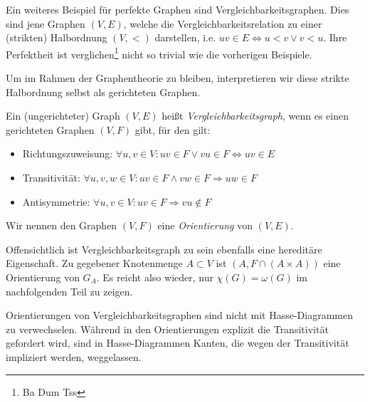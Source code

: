 \documentclass[../main.tex]{subfiles}
\begin{document}
Ein weiteres Beispiel für perfekte Graphen sind Vergleichbarkeitsgraphen. Dies sind jene Graphen $(V, E)$, welche die Vergleichbarkeitsrelation zu einer (strikten) Halbordnung $(V, <)$ darstellen, i.e. $uv \in E \Leftrightarrow u < v \vee v < u$. Ihre Perfektheit ist verglichen\footnote{Ba Dum Tss} nicht so trivial wie die vorherigen Beispiele.

Um im Rahmen der Graphentheorie zu bleiben, interpretieren wir diese strikte Halbordnung selbst als gerichteten Graphen.

\begin{definition}[Vergleichbarkeitsgraph]
    Ein (ungerichteter) Graph $(V, E)$ heißt \emph{Vergleichbarkeitsgraph}, wenn es einen gerichteten Graphen $(V, F)$ gibt, für den gilt:
    \begin{itemize}
        \item Richtungszuweisung: $\forall u, v \in V : uv \in F \vee vu \in F \Leftrightarrow uv \in E$
        \item Transitivität: $\forall u, v, w \in V : uv \in F \wedge vw \in F \Rightarrow uw \in F$
        \item Antisymmetrie: $\forall u, v \in V : uv \in F \Rightarrow vu \notin F$
    \end{itemize}
    Wir nennen den Graphen $(V, F)$ eine \emph{Orientierung} von $(V, E)$.
\end{definition}

Offensichtlich ist Vergleichbarkeitsgraph zu sein ebenfalls eine hereditäre Eigenschaft. Zu gegebener Knotenmenge $A \subset V$ ist $(A, F \cap (A \times A))$ eine Orientierung von $G_A$. Es reicht also wieder, nur $\chi(G) = \omega(G)$ im nachfolgenden Teil zu zeigen.

\begin{bemerkung}
    Orientierungen von Vergleichbarkeitsgraphen sind nicht mit Hasse-Diagrammen zu verwechselen. Während in den Orientierungen explizit die Transitivität gefordert wird, sind in Hasse-Diagrammen Kanten, die wegen der Transitivität impliziert werden, weggelassen.
\end{bemerkung}

\end{document}
